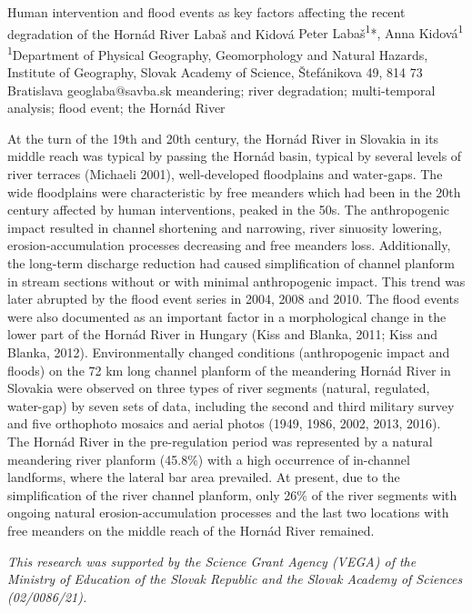 \abstract
{Human intervention and flood events as key factors affecting the recent degradation of the Hornád River} 
{Labaš and Kidová} 
{Peter Labaš\textsuperscript{1}*, Anna Kidová\textsuperscript{1}} 
{\KLtag} 
{
\textsuperscript{1}Department of Physical Geography, Geomorphology and Natural Hazards, Institute of Geography, Slovak Academy of Science, Štefánikova 49, 814 73 Bratislava
}
{geoglaba@savba.sk}  %
{meandering; river degradation; multi-temporal analysis; flood event; the Hornád River}
{At the turn of the 19th and 20th century, the Hornád River in Slovakia in its middle reach was typical by passing the Hornád basin, typical by several levels of river terraces (Michaeli 2001), well-developed floodplains and water-gaps. The wide floodplains were characteristic by free meanders which had been in the 20th century affected by human interventions, peaked in the 50s. The anthropogenic impact resulted in channel shortening and narrowing, river sinuosity lowering, erosion-accumulation processes decreasing and free meanders loss. Additionally, the long-term discharge reduction had caused simplification of channel planform in stream sections without or with minimal anthropogenic impact. This trend was later abrupted by the flood event series in 2004, 2008 and 2010. The flood events were also documented as an important factor in a morphological change in the lower part of the Hornád River in Hungary (Kiss and Blanka, 2011; Kiss and Blanka, 2012). Environmentally changed conditions (anthropogenic impact and floods) on the 72 km long channel planform of the meandering Hornád River in Slovakia were observed on three types of river segments (natural, regulated, water-gap) by seven sets of data, including the second and third military survey and five orthophoto mosaics and aerial photos (1949, 1986, 2002, 2013, 2016). The Hornád River in the pre-regulation period was represented by a natural meandering river planform (45.8\%) with a high occurrence of in-channel landforms, where the lateral bar area prevailed. At present, due to the simplification of the river channel planform, only 26\% of the river segments with ongoing natural erosion-accumulation processes and the last two locations with free meanders on the middle reach of the Hornád River remained.

\textit{This research was supported by the Science Grant Agency (VEGA) of the Ministry of Education of the Slovak Republic and the Slovak Academy of Sciences (02/0086/21).}
}
